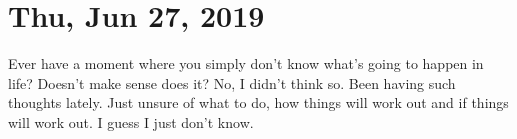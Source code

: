 \section{Thu, Jun 27, 2019}

Ever have a moment where you simply don't know what's going to happen in life? 
Doesn't make sense does it? No, I didn't think so. Been having such thoughts 
lately. Just unsure of what to do, how things will work out and if things will 
work out. I guess I just don't know.
